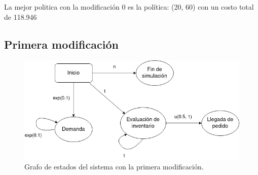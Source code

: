 \documentclass[12pt, spanish]{article}
\begin{document}
La mejor politica con la modificación 0 es la política: (20, 60) con un costo total de 118.946



\subsection{Primera modificación}




\begin{figure}[H]
  \centering
   \includegraphics[width=\textwidth]{grafo_sucesos_mod1.png}
	\caption{Grafo de estados del sistema con la primera modificación.}
\end{figure}
\end{document}
